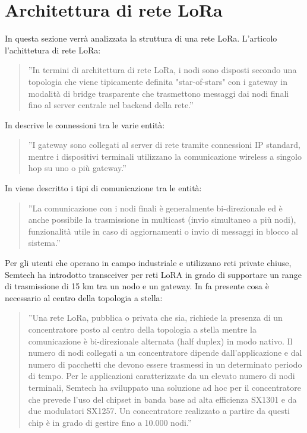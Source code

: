 \documentclass[a4paper]{report} %
\begin{document}
\section{Architettura di rete LoRa}
In questa sezione verrà analizzata la struttura di una rete LoRa. L'articolo \cite{art:rif.27} l'achittetura di rete LoRa:
\begin{quote}
	''In termini di architettura di rete LoRa, i nodi sono disposti secondo una topologia che viene tipicamente definita "star-of-stars" con i gateway in modalità di bridge trasparente che trasmettono messaggi dai nodi finali fino al server centrale nel backend della rete.''
\end{quote}
In \cite{art:rif.28} descrive le connessioni tra le varie entità:
\begin{quote}
	''I gateway sono collegati al server di rete tramite connessioni IP standard, mentre i dispositivi terminali utilizzano la comunicazione wireless a singolo hop su uno o più gateway.'' 
\end{quote}
In \cite{art:rif.27} viene descritto i tipi di comunicazione tra le entità: 
\begin{quote}
	''La comunicazione con i nodi finali è generalmente bi-direzionale ed è anche possibile la trasmissione in multicast (invio simultaneo a più nodi), funzionalità utile in caso di aggiornamenti o invio di messaggi in blocco al sistema.'' 
\end{quote}
Per gli utenti che operano in campo industriale e utilizzano reti private chiuse, Semtech ha introdotto transceiver per reti LoRA in grado di supportare un range di trasmissione di 15 km tra un nodo e un gateway. 
In \cite{art:rif.23} fa presente cosa è necessario al centro della topologia a stella:
\begin{quote}
	''Una rete LoRa, pubblica o privata che sia, richiede la presenza di un concentratore posto al centro della topologia a stella mentre la comunicazione è bi-direzionale alternata (half duplex) in modo nativo. Il numero di nodi collegati a un concentratore dipende dall'applicazione e dal numero di pacchetti che devono essere trasmessi in un determinato periodo di tempo. Per le applicazioni caratterizzate da un elevato numero di nodi terminali, Semtech ha sviluppato una soluzione ad hoc per il concentratore che prevede l'uso del chipset in banda base ad alta efficienza SX1301 e da due modulatori SX1257. Un concentratore realizzato a partire da questi chip è in grado di gestire fino a 10.000 nodi.''
\end{quote}
\end{document}
